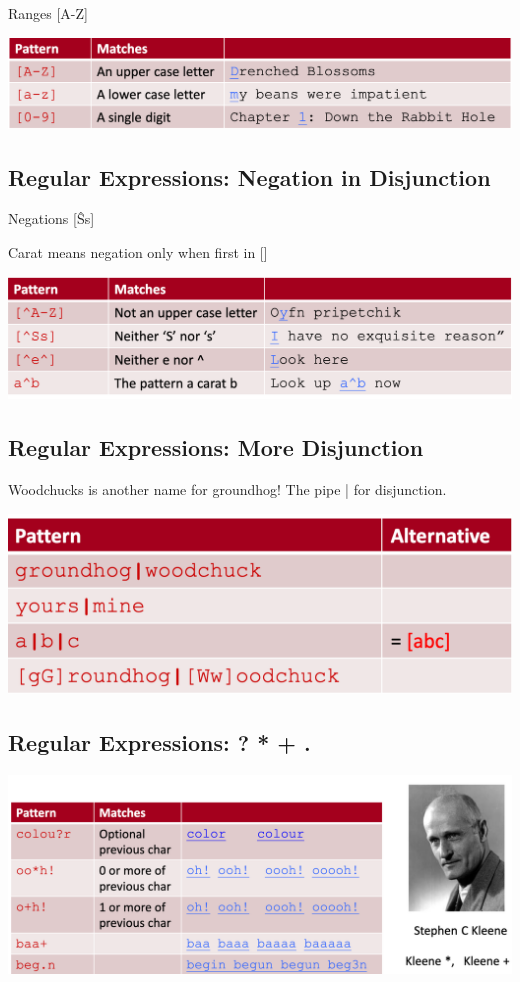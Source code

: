 \documentclass[11pt]{article}
\theoremstyle{definition}
\begin{document}
Ranges [A-Z]

\includegraphics[width=\textwidth]{8.png}

\subsection{Regular Expressions: Negation in Disjunction}
Negations [\^Ss]

Carat means negation only when first in []

\includegraphics[width=\textwidth]{9.png}

\subsection{Regular Expressions: More Disjunction}
Woodchucks is another name for groundhog! The pipe | for disjunction.

\includegraphics[width=\textwidth]{10.png}

\subsection{Regular Expressions: ? * + .}
\includegraphics[width=\textwidth]{11.png}
\end{document}
